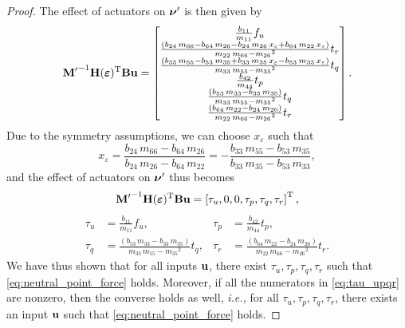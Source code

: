 \begin{proof}
    The effect of actuators on $\bm{\nu}^{\prime}$ is then given by
    \begin{equation}
        {\mathbf{M}^{\prime}}^{-1}\mathbf{H}(\bm{\varepsilon})^{\mathrm{T}}\mathbf{B}\mathbf{u} =
        \begin{bmatrix}
            \frac{b_{11}}{m_{11}} f_{u}\\ \frac{\left(b_{24}\,m_{66}-b_{64}\,m_{26}-b_{24}\,m_{26}\,x_{\varepsilon}+b_{64}\,m_{22}\,x_{\varepsilon}\right)}{m_{22}\,m_{66}-{m_{26}}^2} t_{r} \\ \frac{\left(b_{33}\,m_{55}-b_{53}\,m_{35}+b_{33}\,m_{35}\,x_{\varepsilon}-b_{53}\,m_{33}\,x_{\varepsilon}\right)}{m_{33}\,m_{55}-{m_{35}}^2} t_{q} \\ \frac{b_{42}}{m_{44}} t_{p}\\ \frac{\left(b_{53}\,m_{33}-b_{33}\,m_{35}\right)}{m_{33}\,m_{55}-{m_{35}}^2} t_{q} \\ \frac{\left(b_{64}\,m_{22}-b_{24}\,m_{26}\right)}{m_{22}\,m_{66}-{m_{26}}^2} t_{r}
        \end{bmatrix}.
    \end{equation}
    Due to the symmetry assumptions, we can choose $x_{\varepsilon}$ such that
    \begin{equation}
        x_{\varepsilon} = 
        \frac{b_{24}\,m_{66}-b_{64}\,m_{26}}{b_{24}\,m_{26}-b_{64}\,m_{22}} = 
        -\frac{b_{33}\,m_{55}-b_{53}\,m_{35}}{b_{33}\,m_{35}-b_{53}\,m_{33}},
    \end{equation}
    and the effect of actuators on $\bm{\nu}^{\prime}$ thus becomes
    \begin{equation}
        {\mathbf{M}^{\prime}}^{-1}\mathbf{H}(\bm{\varepsilon})^{\mathrm{T}}\mathbf{B}\mathbf{u} = \left[\tau_u, 0, 0, \tau_p, \tau_q, \tau_r\right]^{\mathrm{T}},
    \end{equation} \vspace{-1.5em}
    \begin{subequations}
        \begin{align}
            \tau_u &= \frac{b_{11}}{m_{11}} f_{u}, &
            \tau_p &= \frac{b_{42}}{m_{44}} t_{p}, \\
            \tau_q &= \frac{\left(b_{53}\,m_{33}-b_{33}\,m_{35}\right)}{m_{33}\,m_{55}-{m_{35}}^2} t_{q}, &
            \tau_r &= \frac{\left(b_{64}\,m_{22}-b_{24}\,m_{26}\right)}{m_{22}\,m_{66}-{m_{26}}^2} t_{r}.
        \end{align} 
        \label{eq:tau_upqr}
    \end{subequations}
    We have thus shown that for all inputs $\mathbf{u}$, there exist $\tau_u, \tau_p, \tau_q, \tau_r$ such that \eqref{eq:neutral_point_force} holds.
    Moreover, if all the numerators in \eqref{eq:tau_upqr} are nonzero, then the converse holds as well, \emph{i.e.,} for all $\tau_u, \tau_p, \tau_q, \tau_r$, there exists an input $\mathbf{u}$ such that \eqref{eq:neutral_point_force} holds.
\end{proof}

